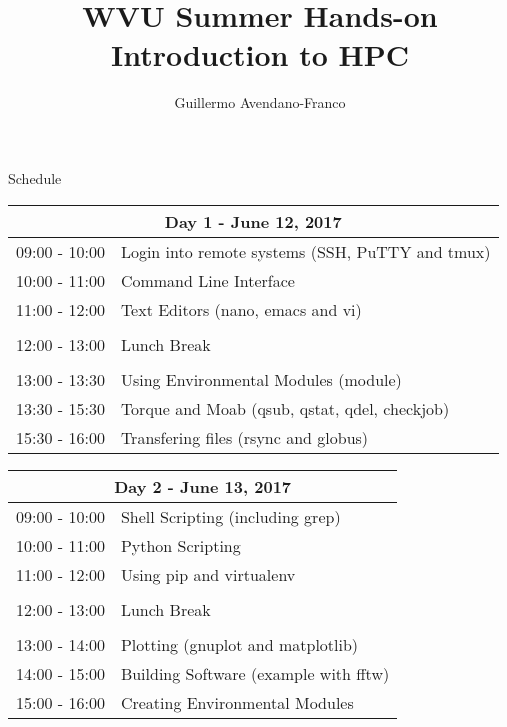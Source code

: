 \documentclass[letterpaper,oneside, notitlepage]{scrbook}
\title{WVU Summer Hands-on Introduction to HPC}
\author{Guillermo Avendano-Franco}
\begin{document}
\maketitle
\tableofcontents

\newpage
\begin{center}
\LARGE Schedule
\end{center}

\begin{tabularx}{0.95\textwidth}{|l|X|}
  \hline
  \multicolumn{2}{|c|}{Day 1 - June 12, 2017} \\
  \hline
09:00 - 10:00 & Login into remote systems (SSH, PuTTY and tmux)\\
10:00 - 11:00 & Command Line Interface\\
11:00 - 12:00 & Text Editors (nano, emacs and vi)\\
&\\
12:00 - 13:00 & Lunch Break\\
&\\
13:00 - 13:30 & Using Environmental Modules (module)\\
13:30 - 15:30 & Torque and Moab (qsub, qstat, qdel, checkjob)\\
15:30 - 16:00 & Transfering files (rsync and globus)\\
\hline
\end{tabularx}

\bigskip

\begin{tabularx}{0.95\textwidth}{|l|X|}
  \hline
  \multicolumn{2}{|c|}{Day 2 - June 13, 2017} \\
  \hline
09:00 - 10:00 & Shell Scripting (including grep)\\
10:00 - 11:00 & Python Scripting\\
11:00 - 12:00 & Using pip and virtualenv\\
&\\
12:00 - 13:00 & Lunch Break\\
&\\
13:00 - 14:00 & Plotting (gnuplot and matplotlib)\\
14:00 - 15:00 & Building Software (example with fftw)\\
15:00 - 16:00 & Creating Environmental Modules\\
\hline
\end{tabularx}

\bigskip
\end{document}
